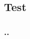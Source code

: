 \documentclass[ignorenonframetext,14pt]{beamer}
\begin{document}
\subsection{Test}

\begin{frame}
    \frametitle{\insertsectionnumber.\insertsubsectionnumber. \insertsubsectionhead}

\end{frame}


%
%
%
\end{document}
